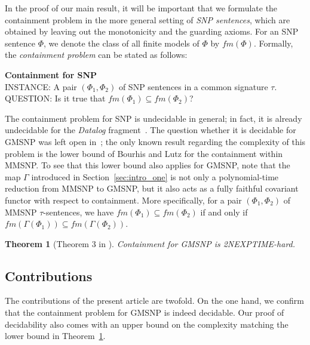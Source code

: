 \documentclass[oneside,reqno,12pt]{amsart}
\theoremstyle{plain}
\newtheorem{theorem}[thm]{Theorem}
\theoremstyle{remark}
\newcommand{\fm}{\ensuremath{\mathit{fm}}\xspace}
\newcommand{\TWONEXPTIME}{{\textup{\textsf{2NEXPTIME}}}\xspace}
\begin{document}
In the proof of our main result, it will be important that we formulate the containment problem in the more general setting of \emph{SNP sentences}, which are obtained by leaving out the monotonicity and the guarding axioms.
For an SNP sentence $\Phi$, we denote the class of all finite models of $\Phi$ by $\fm(\Phi)$.
Formally, the \emph{containment problem} can be stated as follows:

\medskip  
\begin{samepage}  
\noindent \textbf{Containment for SNP} \\
\noindent INSTANCE: A pair $(\Phi_1, \Phi_2)$ of SNP sentences in a common signature $\tau$.\\
\noindent QUESTION: Is it true that $\fm(\Phi_1) \subseteq \fm(\Phi_2)$? \\ 
\end{samepage} 

The containment problem for SNP is undecidable in general; in fact, it is already undecidable for the \emph{Datalog} fragment~\cite{shmueli1993equivalence}. 
The question whether it is decidable for GMSNP was left open in~\cite{bienvenu2014,bouhris_lutz2016}; the only known result regarding the complexity of this problem is the lower bound of Bourhis and Lutz for the containment within MMSNP.
To see that this lower bound also applies for GMSNP, note that the map $\Gamma$ introduced in Section~\ref{sec:intro_one} is not only a polynomial-time reduction from MMSNP to GMSNP, but it also acts as a fully faithful covariant functor with respect to containment.
More specifically, for a pair $(\Phi_1, \Phi_2)$ of MMSNP $\tau$-sentences, we have $\fm(\Phi_1) \subseteq \fm(\Phi_2)$ if and only if $\fm(\Gamma(\Phi_1)) \subseteq \fm(\Gamma(\Phi_2))$.

\begin{theorem}[Theorem 3 in \cite{bouhris_lutz2016}]\label{th:lowerbound} Containment for GMSNP is \TWONEXPTIME-hard.
\end{theorem} 
 



\subsection{Contributions} \label{sec:contributions}

The contributions of the present article are twofold.
On the one hand, we confirm that the containment problem for GMSNP is indeed decidable. Our proof of decidability also comes with an upper bound on the complexity matching the lower bound in Theorem~\ref{th:lowerbound}.
  
\end{document}
